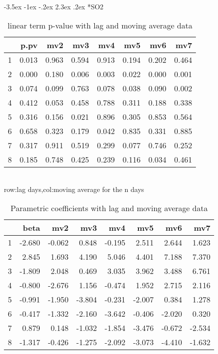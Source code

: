 \documentclass[a4paper, 12pt]{article}
\makeatletter
\def\large{\fontsize{14}{20}\selectfont}
\renewcommand\subsection{\@startsection {subsection}{1}{\z@}%
                                   {-3.5ex \@plus -1ex \@minus -.2ex}%
                                   {2.3ex \@plus.2ex}%
                                   {\centering\normalfont\large\bfseries}}
\makeatother
\begin{document}
\subsection*{SO2}
\begin{table}[h]
\centering
\caption{linear term p-value with lag and moving average data}
\begin{tabular}{rrrrrrrr}
  \hline
 & p.pv & mv2 & mv3 & mv4 & mv5 & mv6 & mv7 \\
  \hline
1 & 0.013 & 0.963 & 0.594 & 0.913 & 0.194 & 0.202 & 0.464 \\
  2 & 0.000 & 0.180 & 0.006 & 0.003 & 0.022 & 0.000 & 0.001 \\
  3 & 0.074 & 0.099 & 0.763 & 0.078 & 0.038 & 0.090 & 0.002 \\
  4 & 0.412 & 0.053 & 0.458 & 0.788 & 0.311 & 0.188 & 0.338 \\
  5 & 0.316 & 0.156 & 0.021 & 0.896 & 0.305 & 0.853 & 0.564 \\
  6 & 0.658 & 0.323 & 0.179 & 0.042 & 0.835 & 0.331 & 0.885 \\
  7 & 0.317 & 0.911 & 0.519 & 0.299 & 0.077 & 0.746 & 0.252 \\
  8 & 0.185 & 0.748 & 0.425 & 0.239 & 0.116 & 0.034 & 0.461 \\
   \hline
\end{tabular}
\\row:lag days,col:moving average for the n days
\end{table}

\begin{table}[h]
\centering
\caption{Parametric coefficients with lag and moving average data}
\begin{tabular}{rrrrrrrr}
  \hline
 & beta & mv2 & mv3 & mv4 & mv5 & mv6 & mv7 \\
  \hline
1 & -2.680 & -0.062 & 0.848 & -0.195 & 2.511 & 2.644 & 1.623 \\
  2 & 2.845 & 1.693 & 4.190 & 5.046 & 4.401 & 7.188 & 7.370 \\
  3 & -1.809 & 2.048 & 0.469 & 3.035 & 3.962 & 3.488 & 6.761 \\
  4 & -0.800 & -2.676 & 1.156 & -0.474 & 1.952 & 2.715 & 2.116 \\
  5 & -0.991 & -1.950 & -3.804 & -0.231 & -2.007 & 0.384 & 1.278 \\
  6 & -0.417 & -1.332 & -2.160 & -3.642 & -0.406 & -2.020 & 0.320 \\
  7 & 0.879 & 0.148 & -1.032 & -1.854 & -3.476 & -0.672 & -2.534 \\
  8 & -1.317 & -0.426 & -1.275 & -2.092 & -3.073 & -4.410 & -1.632 \\
   \hline
\end{tabular}
\end{table}
\clearpage
\end{document}
